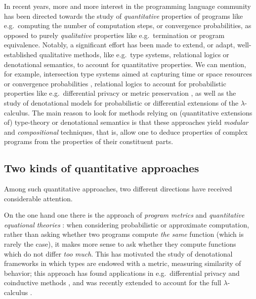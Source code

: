 
In recent years, more and more interest in the programming language community has been directed towards the study of \emph{quantitative} properties of programs like e.g.~computing the number of computation steps, or convergence probabilities, 
as opposed to purely \emph{qualitative} properties like e.g.~termination or program equivalence. 
Notably, a significant effort has been made to extend, or adapt, well-established qualitative methods, like e.g.~type systems, relational logics or denotational semantics, to account for quantitative properties. We can mention, for example, 
intersection type systems aimed at capturing time or space resources \cite{decarvalho2018, Accattoli2022} or convergence probabilities \cite{Breuvart2018, PistoneLICS2022},  relational logics to account for probabilistic properties like e.g.~differential privacy \cite{Barthe_2012} or metric preservation \cite{Reed2010, dallago}, as well as the study of denotational models for 
probabilistic \cite{Ehrhard2011, Staton2017} or differential \cite{difflambda} extensions of the $\lambda$-calculus. 
The main reason to look for methods relying on (quantitative extensions of) type-theory or denotational semantics is that these approaches yield \emph{modular} and \emph{compositional} techniques, that is, allow one to deduce properties of complex programs from the properties of their constituent parts.   

\subsection{Two kinds of quantitative approaches}

Among such quantitative approaches, two different directions have received considerable attention. 

On the one hand one there is the approach of \emph{program metrics} \cite{Reed2010, Gaboardi2017, Gabo2019} and \emph{quantitative equational theories} \cite{Plotk}: when considering probabilistic or approximate computation, rather than asking whether two programs compute \emph{the same} function (which is rarely the case), it makes more sense to ask   whether they compute functions which do not differ \emph{too much}. This has motivated the study of denotational frameworks in which types are endowed with a metric, measuring similarity of behavior; this approach has found  applications in e.g.~differential privacy \cite{Reed2010} and coinductive methods \cite{Bonchi2018}, and was recently extended to account for the full $\lambda$-calculus \cite{Geoffroy2020, PistoneLICS, PistoneFSCD2022}.

